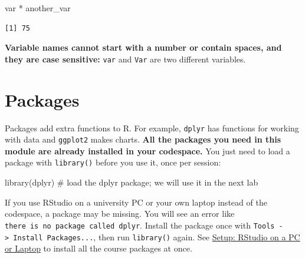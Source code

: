 \documentclass[
  letterpaper,
  DIV=11,
  numbers=noendperiod]{scrreprt}
\newenvironment{Shaded}{\begin{snugshade}}{\end{snugshade}}
\newcommand{\CommentTok}[1]{\textcolor[rgb]{0.37,0.37,0.37}{#1}}
\newcommand{\FunctionTok}[1]{\textcolor[rgb]{0.28,0.35,0.67}{#1}}
\newcommand{\NormalTok}[1]{\textcolor[rgb]{0.00,0.23,0.31}{#1}}
\newcommand{\SpecialCharTok}[1]{\textcolor[rgb]{0.37,0.37,0.37}{#1}}
\begin{document}
\begin{Shaded}
\begin{Highlighting}[]
\NormalTok{var }\SpecialCharTok{*}\NormalTok{ another\_var}
\end{Highlighting}
\end{Shaded}

\begin{verbatim}
[1] 75
\end{verbatim}

\textbf{Variable names cannot start with a number or contain spaces, and
they are case sensitive:} \texttt{var} and \texttt{Var} are two
different variables.

\section{Packages}\label{packages}

Packages add extra functions to R. For example, \texttt{dplyr} has
functions for working with data and \texttt{ggplot2} makes charts.
\textbf{All the packages you need in this module are already installed
in your codespace.} You just need to load a package with
\texttt{library()} before you use it, once per session:

\begin{Shaded}
\begin{Highlighting}[]
\FunctionTok{library}\NormalTok{(dplyr)   }\CommentTok{\# load the dplyr package; we will use it in the next lab}
\end{Highlighting}
\end{Shaded}

\begin{tcolorbox}[enhanced jigsaw, arc=.35mm, bottomrule=.15mm, bottomtitle=1mm, breakable, colback=white, colbacktitle=quarto-callout-note-color!10!white, colframe=quarto-callout-note-color-frame, coltitle=black, left=2mm, leftrule=.75mm, opacityback=0, opacitybacktitle=0.6, rightrule=.15mm, title=\textcolor{quarto-callout-note-color}{\faInfo}\hspace{0.5em}{Note}, titlerule=0mm, toprule=.15mm, toptitle=1mm]

If you use RStudio on a university PC or your own laptop instead of the
codespace, a package may be missing. You will see an error like
\texttt{there\ is\ no\ package\ called\ \textquotesingle{}dplyr\textquotesingle{}}.
Install the package once with
\texttt{Tools\ -\textgreater{}\ Install\ Packages...}, then run
\texttt{library()} again. See
\hyperref[setup-rstudio-on-a-pc-or-laptop]{Setup: RStudio on a PC or
Laptop} to install all the course packages at once.

\end{tcolorbox}
\end{document}
